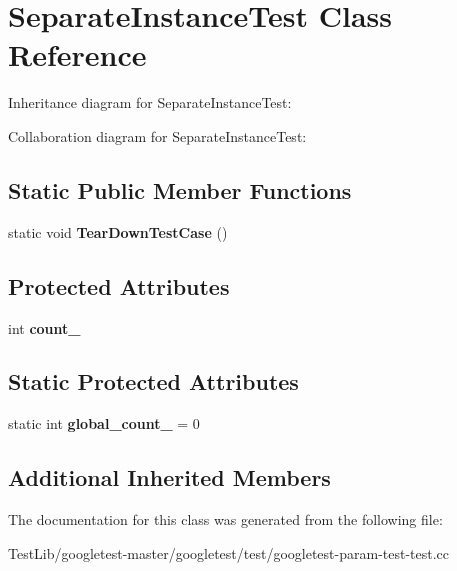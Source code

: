 \hypertarget{classSeparateInstanceTest}{}\section{Separate\+Instance\+Test Class Reference}
\label{classSeparateInstanceTest}


Inheritance diagram for Separate\+Instance\+Test\+:


Collaboration diagram for Separate\+Instance\+Test\+:
\subsection*{Static Public Member Functions}
\begin{DoxyCompactItemize}
\item 
\mbox{\label{classSeparateInstanceTest_a7c4a72843a7c4a9be56adef27ecd33c7}} 
static void {\bfseries Tear\+Down\+Test\+Case} ()
\end{DoxyCompactItemize}
\subsection*{Protected Attributes}
\begin{DoxyCompactItemize}
\item 
\mbox{\label{classSeparateInstanceTest_a04af1b3b711671ecb0778af1330a740f}} 
int {\bfseries count\+\_\+}
\end{DoxyCompactItemize}
\subsection*{Static Protected Attributes}
\begin{DoxyCompactItemize}
\item 
\mbox{\label{classSeparateInstanceTest_a79db6d4cdd6c99b256439cc020f782ef}} 
static int {\bfseries global\+\_\+count\+\_\+} = 0
\end{DoxyCompactItemize}
\subsection*{Additional Inherited Members}


The documentation for this class was generated from the following file\+:\begin{DoxyCompactItemize}
\item 
Test\+Lib/googletest-\/master/googletest/test/googletest-\/param-\/test-\/test.\+cc\end{DoxyCompactItemize}
